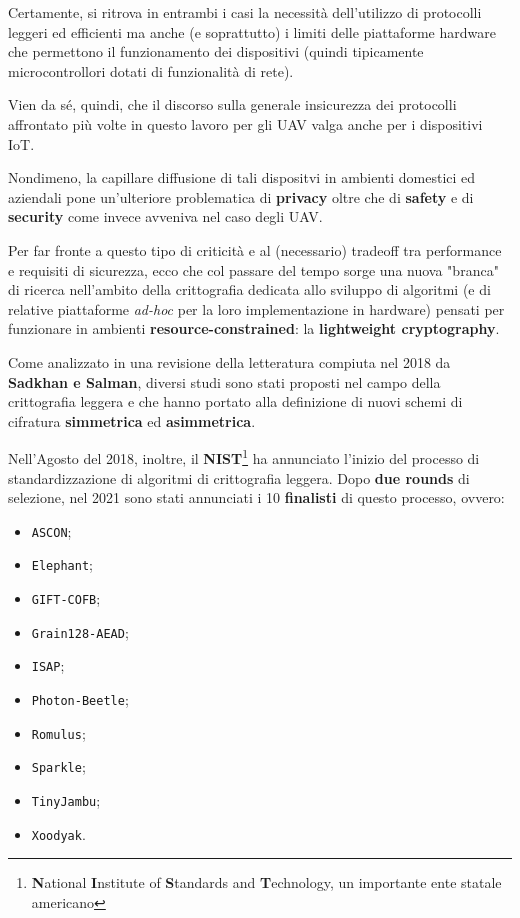 \documentclass[a4paper, 12pt, oneside]{article}
\theoremstyle{definition}
\begin{document}
Certamente, si ritrova in entrambi i casi la necessità dell'utilizzo di protocolli leggeri ed efficienti ma anche (e soprattutto) i limiti delle piattaforme hardware che permettono il funzionamento dei dispositivi (quindi tipicamente microcontrollori dotati di funzionalità di rete). 

Vien da sé, quindi, che il discorso sulla generale insicurezza dei protocolli affrontato più volte in questo lavoro per gli UAV valga anche per i dispositivi IoT. 

Nondimeno, la capillare diffusione di tali dispositvi in ambienti domestici ed aziendali pone un'ulteriore problematica di \textbf{privacy} oltre che di \textbf{safety} e di \textbf{security} come invece avveniva nel caso degli UAV.

Per far fronte a questo tipo di criticità e al (necessario) tradeoff tra performance e requisiti di sicurezza, ecco che col passare del tempo sorge una nuova "branca" di ricerca nell'ambito della crittografia dedicata allo sviluppo di algoritmi (e di relative piattaforme \textit{ad-hoc} per la loro implementazione in hardware) pensati per funzionare in ambienti \textbf{resource-constrained}: la \textbf{lightweight cryptography}.

Come analizzato in una revisione della letteratura \cite{8370965} compiuta nel 2018 da \textbf{Sadkhan e Salman}, diversi studi sono stati proposti nel campo della crittografia leggera e che hanno portato alla definizione di nuovi schemi di cifratura \textbf{simmetrica} ed \textbf{asimmetrica}.

Nell'Agosto del 2018, inoltre, il \textbf{NIST}\footnote{\textbf{N}ational \textbf{I}nstitute of \textbf{S}tandards and \textbf{T}echnology, un importante ente statale americano} ha annunciato l'inizio del processo di standardizzazione \cite{nist-request-lwc} di algoritmi di crittografia leggera. Dopo \textbf{due rounds} di selezione, nel 2021 sono stati annunciati i 10 \textbf{finalisti} \cite{nist-finalists-lwc} di questo processo, ovvero:

\begin{itemize}
    \item \texttt{ASCON};
    \item \texttt{Elephant};
    \item \texttt{GIFT-COFB};
    \item \texttt{Grain128-AEAD};
    \item \texttt{ISAP};
    \item \texttt{Photon-Beetle};
    \item \texttt{Romulus};
    \item \texttt{Sparkle};
    \item \texttt{TinyJambu};
    \item \texttt{Xoodyak}.
\end{itemize}
\end{document}
